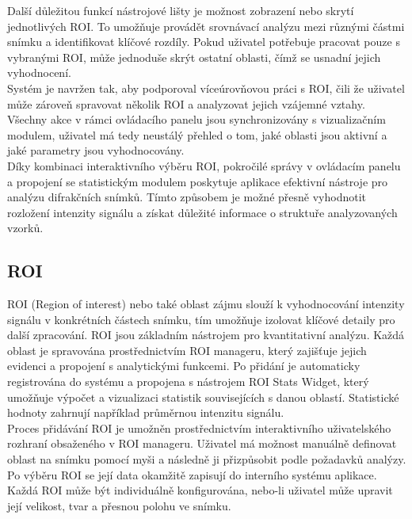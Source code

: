 \documentclass{article}
\begin{document}
Další důležitou funkcí nástrojové lišty je možnost zobrazení nebo skrytí jednotlivých ROI. To umožňuje provádět srovnávací analýzu mezi různými částmi snímku a identifikovat klíčové rozdíly. Pokud uživatel potřebuje pracovat pouze s vybranými ROI, může jednoduše skrýt ostatní oblasti, čímž se usnadní jejich vyhodnocení.\\

Systém je navržen tak, aby podporoval víceúrovňovou práci s ROI, čili že uživatel může zároveň spravovat několik ROI a analyzovat jejich vzájemné vztahy. Všechny akce v rámci ovládacího panelu jsou synchronizovány s vizualizačním modulem, uživatel má tedy neustálý přehled o tom, jaké oblasti jsou aktivní a jaké parametry jsou vyhodnocovány.\\

Díky kombinaci interaktivního výběru ROI, pokročilé správy v ovládacím panelu a propojení se statistickým modulem poskytuje aplikace efektivní nástroje pro analýzu difrakčních snímků. Tímto způsobem je možné přesně vyhodnotit rozložení intenzity signálu a získat důležité informace o struktuře analyzovaných vzorků.\\

\subsection{ROI}
 ROI (Region of interest) nebo také oblast zájmu slouží k vyhodnocování intenzity signálu v konkrétních částech snímku, tím umožňuje izolovat klíčové detaily pro další zpracování. ROI jsou základním nástrojem pro kvantitativní analýzu. Každá oblast je spravována prostřednictvím ROI manageru, který zajišťuje jejich evidenci a propojení s analytickými funkcemi. Po přidání je automaticky registrována do systému a propojena s nástrojem ROI Stats Widget, který umožňuje výpočet a vizualizaci statistik souvisejících s danou oblastí. Statistické hodnoty zahrnují například průměrnou intenzitu signálu.\\

Proces přidávání ROI je umožněn prostřednictvím interaktivního uživatelského rozhraní obsaženého v ROI manageru. Uživatel má možnost manuálně definovat oblast na snímku pomocí myši a následně ji přizpůsobit podle požadavků analýzy. Po výběru ROI se její data okamžitě zapisují do interního systému aplikace. Každá ROI může být individuálně konfigurována, nebo-li uživatel může upravit její velikost, tvar a přesnou polohu ve snímku.\\
\end{document}
